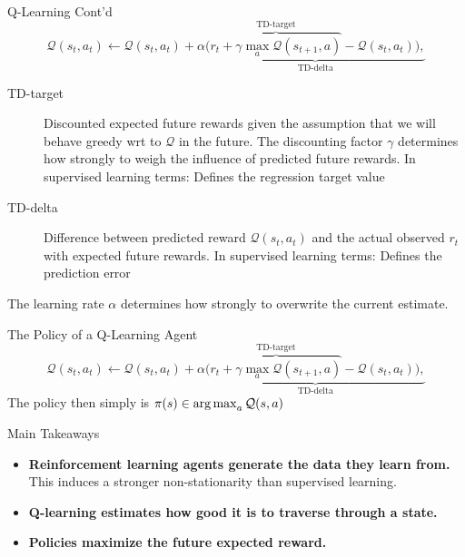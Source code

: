 \documentclass[main]{subfiles}
\begin{document}
\begin{frame}{Q-Learning Cont'd}
    \begin{equation*}
        \mathcal{Q}(s_t, a_t) \gets \mathcal{Q}(s_t, a_t) +
        \alpha
        \underbrace{
            \Big(
                \overbrace{
                    r_{t} + \gamma \max_a\mathcal{Q}(s_{t+1}, a)
                }^{\text{TD-target}}
                - \mathcal{Q}(s_t,a_t)
            \Big),
        }_{\text{TD-delta}}
    \end{equation*}
    \begin{description}
        \item[TD-target] Discounted expected future rewards given the assumption that we will behave greedy wrt to $\mathcal{Q}$ in the future. The discounting factor $\gamma$ determines how strongly to weigh the influence of predicted future rewards.
        In supervised learning terms: Defines the regression target value\pause
        \item[TD-delta] Difference between predicted reward $\mathcal{Q}(s_t,a_t)$ and the actual observed $r_t$ with expected future rewards.
        In supervised learning terms: Defines the prediction error
    \end{description}\pause
    The learning rate $\alpha$ determines how strongly to overwrite the current estimate.
\end{frame}
\begin{frame}{The Policy of a Q-Learning Agent}
    \centering
    \begin{equation*}
        \mathcal{Q}(s_t, a_t) \gets \mathcal{Q}(s_t, a_t) +
        \alpha
        \underbrace{
            \Big(
                \overbrace{
                    r_{t} + \gamma \max_a\mathcal{Q}(s_{t+1},a)
                }^{\text{TD-target}}
                - \mathcal{Q}(s_t,a_t)
            \Big),
        }_{\text{TD-delta}}
    \end{equation*}
    The policy then simply is $\pi(s) \in \operatorname*{arg\,max}_{a}\mathcal{Q}(s,a)$
\end{frame}
\begin{frame}{Main Takeaways} 

\begin{itemize}
    \item \textbf{Reinforcement learning agents generate the data they learn from.} This induces a stronger non-stationarity than supervised learning.
    \item \textbf{Q-learning estimates how good it is to traverse through a state.}
    \item \textbf{Policies maximize the future expected reward.}
\end{itemize}

\end{frame}
\end{document}
